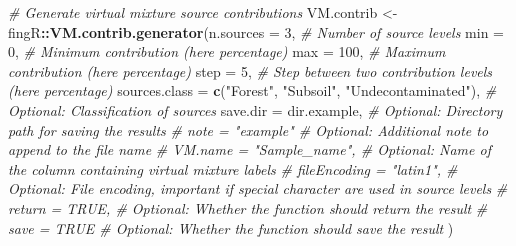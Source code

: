 \documentclass[
]{article}
\newenvironment{Shaded}{\begin{snugshade}}{\end{snugshade}}
\newcommand{\AttributeTok}[1]{\textcolor[rgb]{0.13,0.29,0.53}{#1}}
\newcommand{\CommentTok}[1]{\textcolor[rgb]{0.56,0.35,0.01}{\textit{#1}}}
\newcommand{\DecValTok}[1]{\textcolor[rgb]{0.00,0.00,0.81}{#1}}
\newcommand{\FunctionTok}[1]{\textcolor[rgb]{0.13,0.29,0.53}{\textbf{#1}}}
\newcommand{\NormalTok}[1]{#1}
\newcommand{\OtherTok}[1]{\textcolor[rgb]{0.56,0.35,0.01}{#1}}
\newcommand{\SpecialCharTok}[1]{\textcolor[rgb]{0.81,0.36,0.00}{\textbf{#1}}}
\newcommand{\StringTok}[1]{\textcolor[rgb]{0.31,0.60,0.02}{#1}}
\begin{document}
\begin{Shaded}
\begin{Highlighting}[]
\CommentTok{\# Generate virtual mixture source contributions}
\NormalTok{VM.contrib }\OtherTok{\textless{}{-}}\NormalTok{ fingR}\SpecialCharTok{::}\FunctionTok{VM.contrib.generator}\NormalTok{(}\AttributeTok{n.sources =} \DecValTok{3}\NormalTok{,                                              }\CommentTok{\# Number of source levels}
                                          \AttributeTok{min =} \DecValTok{0}\NormalTok{,                                                    }\CommentTok{\# Minimum contribution (here percentage)}
                                          \AttributeTok{max =} \DecValTok{100}\NormalTok{,                                                  }\CommentTok{\# Maximum contribution (here percentage)}
                                          \AttributeTok{step =} \DecValTok{5}\NormalTok{,                                                   }\CommentTok{\# Step between two contribution levels (here percentage)}
                                          \AttributeTok{sources.class =} \FunctionTok{c}\NormalTok{(}\StringTok{"Forest"}\NormalTok{, }\StringTok{"Subsoil"}\NormalTok{, }\StringTok{"Undecontaminated"}\NormalTok{), }\CommentTok{\# Optional: Classification of sources}
                                          \AttributeTok{save.dir =}\NormalTok{ dir.example,                                     }\CommentTok{\# Optional: Directory path for saving the results}
                                          \CommentTok{\# note = "example"                                          \# Optional: Additional note to append to the file name}
                                          \CommentTok{\# VM.name = "Sample\_name",                                  \# Optional: Name of the column containing virtual mixture labels}
                                          \CommentTok{\# fileEncoding = "latin1",                                  \# Optional: File encoding, important if special character are used in source levels}
                                          \CommentTok{\# return = TRUE,                                            \# Optional: Whether the function should return the result}
                                          \CommentTok{\# save = TRUE                                               \# Optional: Whether the function should save the result}
\NormalTok{                                          )}
\end{Highlighting}
\end{Shaded}
\end{document}
